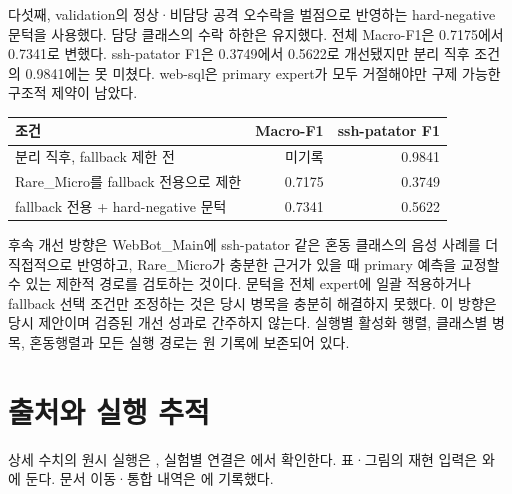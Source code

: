 다섯째, validation의 정상·비담당 공격 오수락을 벌점으로 반영하는 hard-negative 문턱을 사용했다.
담당 클래스의 수락 하한은 유지했다. 전체 Macro-F1은 0.7175에서 0.7341로 변했다.
ssh-patator F1은 0.3749에서 0.5622로 개선됐지만 분리 직후 조건의 0.9841에는 못 미쳤다.
web-sql은 primary expert가 모두 거절해야만 구제 가능한 구조적 제약이 남았다.

\begin{longtable}{p{.50\linewidth}rr}
\toprule 조건 & Macro-F1 & ssh-patator F1 \\\midrule\endhead
분리 직후, fallback 제한 전 & 미기록 & 0.9841 \\
Rare\_Micro를 fallback 전용으로 제한 & 0.7175 & 0.3749 \\
fallback 전용 + hard-negative 문턱 & 0.7341 & 0.5622 \\\bottomrule
\end{longtable}

후속 개선 방향은 WebBot\_Main에 ssh-patator 같은 혼동 클래스의 음성 사례를 더 직접적으로 반영하고,
Rare\_Micro가 충분한 근거가 있을 때 primary 예측을 교정할 수 있는 제한적 경로를 검토하는 것이다.
문턱을 전체 expert에 일괄 적용하거나 fallback 선택 조건만 조정하는 것은 당시 병목을 충분히 해결하지 못했다.
이 방향은 당시 제안이며 검증된 개선 성과로 간주하지 않는다.
실행별 활성화 행렬, 클래스별 병목, 혼동행렬과 모든 실행 경로는 원 기록에 보존되어 있다.


\section*{출처와 실행 추적}

상세 수치의 원시 실행은 , 실험별 연결은 에서 확인한다. 표·그림의 재현 입력은 와 에 둔다. 문서 이동·통합 내역은 에 기록했다.


